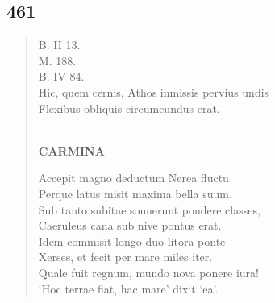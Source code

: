 \documentclass[11pt, a4paper]{report}
\begin{document}
            \subsection*{461}
      \begin{verse}
      B. II 13. \\ M. 188. \\ B. IV 84. \\ Hic, quem cernis, Athos inmissis pervius undis \\ Flexibus obliquis circumeundus erat. \\ 
        ﻿\pagebreak 
    \begin{center} \textbf{CARMINA} \end{center} \marginpar{[340]} Accepit magno deductum Nerea fluctu \\ Perque latus misit maxima bella suum. \\ Sub tanto subitae sonuerunt pondere classes, \\ Caeruleus cana sub nive pontus erat. \\ Idem commisit longo duo litora ponte \\ Xerses, et fecit per mare miles iter. \\ Quale fuit regnum, mundo nova ponere iura! \\ ‘Hoc terrae fiat, hac mare’ dixit ‘ea’. \\ 
      \end{verse}
  
\end{document}
